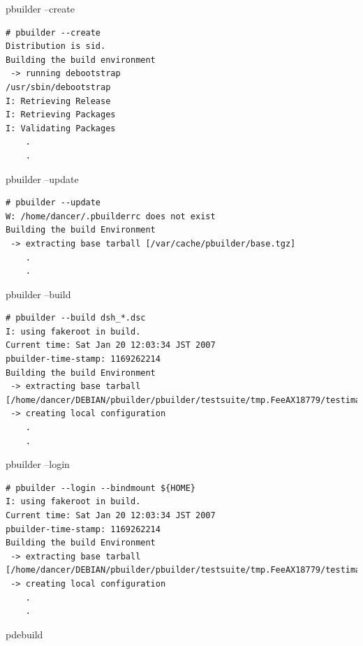 \documentclass[dvipdfm,12pt,times]{beamer}
\newcommand{\emtext}[1]{
\begin{frame}{}
 
{\Huge #1
}
\end{frame}
}
\begin{document}
\begin{frame}[containsverbatim]{pbuilder --create}
\begin{verbatim}
# pbuilder --create
Distribution is sid.
Building the build environment
 -> running debootstrap
/usr/sbin/debootstrap
I: Retrieving Release
I: Retrieving Packages
I: Validating Packages
	.
	.
\end{verbatim}
\end{frame}

\begin{frame}[containsverbatim]{pbuilder --update}
\begin{verbatim}
# pbuilder --update
W: /home/dancer/.pbuilderrc does not exist
Building the build Environment
 -> extracting base tarball [/var/cache/pbuilder/base.tgz]
	.
	.
\end{verbatim}
\end{frame}

\begin{frame}[containsverbatim]{pbuilder --build}
\begin{verbatim}
# pbuilder --build dsh_*.dsc
I: using fakeroot in build.
Current time: Sat Jan 20 12:03:34 JST 2007
pbuilder-time-stamp: 1169262214
Building the build Environment
 -> extracting base tarball [/home/dancer/DEBIAN/pbuilder/pbuilder/testsuite/tmp.FeeAX18779/testimage]
 -> creating local configuration
	.
	.
\end{verbatim}
\end{frame}


\begin{frame}[containsverbatim]{pbuilder --login}
\begin{verbatim}
# pbuilder --login --bindmount ${HOME}
I: using fakeroot in build.
Current time: Sat Jan 20 12:03:34 JST 2007
pbuilder-time-stamp: 1169262214
Building the build Environment
 -> extracting base tarball [/home/dancer/DEBIAN/pbuilder/pbuilder/testsuite/tmp.FeeAX18779/testimage]
 -> creating local configuration
	.
	.
\end{verbatim}
\end{frame}

\emtext{pdebuild}
\end{document}
